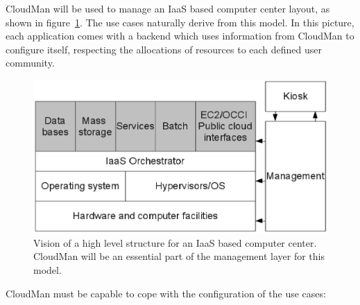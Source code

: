 CloudMan will be used to manage an IaaS based computer center layout, as shown in figure~\ref{iaas}. The use cases naturally derive from this model. In this picture, each application comes with a backend which uses information from CloudMan to configure itself, respecting the allocations of resources to each defined user community.
\begin{figure}
\begin{center}
\includegraphics[width=\textwidth]{iaas.eps}
\caption{\label{iaas}Vision of a high level structure for an IaaS based computer center. CloudMan will be an essential part of the management layer for this model.}
\end{center}
\end{figure}
CloudMan must be capable to cope with the configuration of the use cases:
